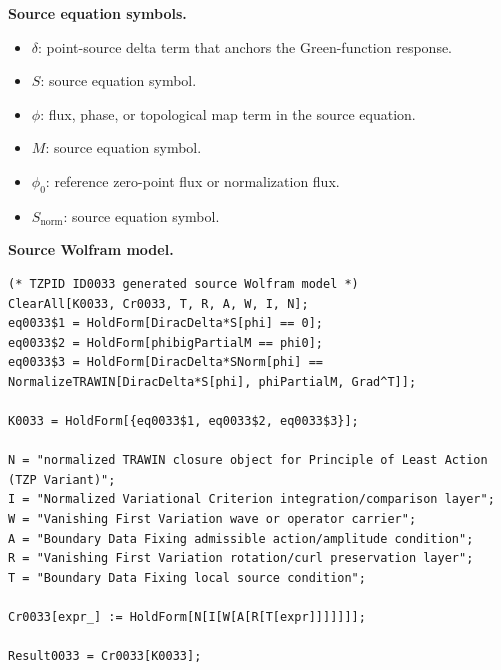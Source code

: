 \begin{minipage}[t]{0.49\linewidth}
\begingroup
\small
\raggedright
\textbf{Source equation symbols.}\par
\begin{itemize}[leftmargin=1.35em,itemsep=1pt,topsep=1pt,parsep=0pt]
    \item $\delta$: point-source delta term that anchors the Green-function response.
    \item $S$: source equation symbol.
    \item $\phi$: flux, phase, or topological map term in the source equation.
    \item $M$: source equation symbol.
    \item $\phi_{0}$: reference zero-point flux or normalization flux.
    \item $S_{\mathrm{norm}}$: source equation symbol.
\end{itemize}
\endgroup
\end{minipage}\hfill
\begin{minipage}[t]{0.47\linewidth}
\begingroup
\scriptsize
\raggedright
\textbf{Source Wolfram model.}\par
\begin{Verbatim}[fontsize=\tiny,breaklines=true,breakanywhere=true]
(* TZPID ID0033 generated source Wolfram model *)
ClearAll[K0033, Cr0033, T, R, A, W, I, N];
eq0033$1 = HoldForm[DiracDelta*S[phi] == 0];
eq0033$2 = HoldForm[phibigPartialM == phi0];
eq0033$3 = HoldForm[DiracDelta*SNorm[phi] == NormalizeTRAWIN[DiracDelta*S[phi], phiPartialM, Grad^T]];

K0033 = HoldForm[{eq0033$1, eq0033$2, eq0033$3}];

N = "normalized TRAWIN closure object for Principle of Least Action (TZP Variant)";
I = "Normalized Variational Criterion integration/comparison layer";
W = "Vanishing First Variation wave or operator carrier";
A = "Boundary Data Fixing admissible action/amplitude condition";
R = "Vanishing First Variation rotation/curl preservation layer";
T = "Boundary Data Fixing local source condition";

Cr0033[expr_] := HoldForm[N[I[W[A[R[T[expr]]]]]]];

Result0033 = Cr0033[K0033];
\end{Verbatim}
\endgroup
\end{minipage}

